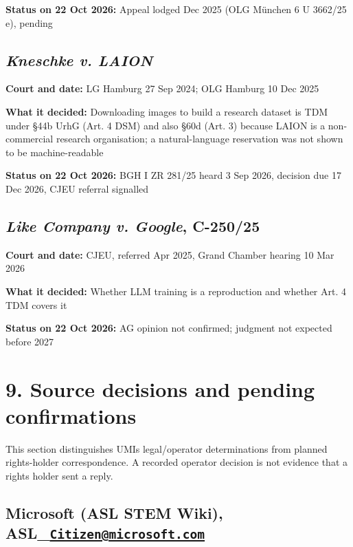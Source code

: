 \documentclass[10pt,a4paper]{article}
\begin{document}
\textbf{Status on 22 Oct 2026:} Appeal lodged Dec 2025 (OLG München 6 U
3662/25 e), pending

\subsection{\texorpdfstring{\emph{Kneschke v.
LAION}}{Kneschke v. LAION}}\label{kneschke-v-laion}

\textbf{Court and date:} LG Hamburg 27 Sep 2024; OLG Hamburg 10 Dec 2025

\textbf{What it decided:} Downloading images to build a research dataset
is TDM under §44b UrhG (Art. 4 DSM) and also §60d (Art. 3) because LAION
is a non-commercial research organisation; a natural-language
reservation was not shown to be machine-readable

\textbf{Status on 22 Oct 2026:} BGH I ZR 281/25 heard 3 Sep 2026,
decision due 17 Dec 2026, CJEU referral signalled

\subsection{\texorpdfstring{\emph{Like Company v. Google},
C-250/25}{Like Company v. Google, C-250/25}}\label{like-company-v-google-c-25025}

\textbf{Court and date:} CJEU, referred Apr 2025, Grand Chamber hearing
10 Mar 2026

\textbf{What it decided:} Whether LLM training is a reproduction and
whether Art. 4 TDM covers it

\textbf{Status on 22 Oct 2026:} AG opinion not confirmed; judgment not
expected before 2027

\section{9. Source decisions and pending confirmations}\label{9-pending-confirmations}

This section distinguishes UMI\textquotesingle s legal/operator
determinations from planned rights-holder correspondence. A recorded
operator decision is not evidence that a rights holder sent a reply.

\subsection{\texorpdfstring{Microsoft (ASL STEM Wiki),
ASL\_\href{mailto:Citizen@microsoft.com}{\nolinkurl{Citizen@microsoft.com}}}{Microsoft (ASL STEM Wiki), ASL\_Citizen@microsoft.com}}\label{microsoft-asl-stem-wiki-asl_citizenmicrosoftcom}
\end{document}
